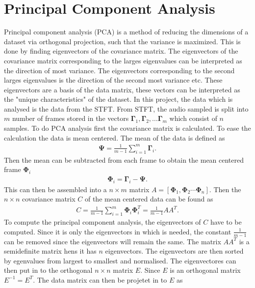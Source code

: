 \section{Principal Component Analysis}
Principal component analysis (PCA) is a method of reducing the dimensions of a dataset via orthogonal projection, such that the variance is maximized. This is done by finding eigenvectors of the covariance matrix.
The eigenvectors of the covariance matrix corresponding to the larges eigenvalues can be interpreted as the direction of most variance. The eigenvectors corresponding to the second larges eigenvalues is the direction of the second most variance etc. These eigenvectors are a basis of the data matrix, these vectors can be interpreted as the "unique characteristics" of the dataset. In this project, the data which is analysed is the data from the STFT. \cite[561]{patternmachineleaning}
From STFT, the audio sampled is split into $m$ number of frames stored in the vectors $\mathbf{\Gamma}_1, \mathbf{\Gamma}_2,\hdots\mathbf{\Gamma}_m$ which consist of $n$ samples.
To do PCA analysis first the covariance matrix is calculated. To ease the calculation the data is mean centered. The mean of the data is defined as
\begin{align*}
    \mathbf{\Psi}=\frac{1}{m-1}\sum_{i=1}^m \mathbf{\Gamma}_i.
\end{align*}
Then the mean can be subtracted from each frame to obtain the mean centered frame $\mathbf{\Phi}_i$
\begin{align*}
    \mathbf{\Phi}_i=\mathbf{\Gamma}_i-\mathbf{\Psi}.
\end{align*}
This can then be assembled into a $n\times m$ matrix $A=[\mathbf{\Phi}_1,\mathbf{\Phi}_2\cdots\mathbf{\Phi}_n]$. Then the $n\times n$ covariance matrix $C$ of the mean centered data can be found as
\begin{align*}
    C=\frac{1}{m-1}\sum_{i=1}^m\mathbf{\Phi}_i\mathbf{\Phi}_i^T=\frac{1}{m-1}AA^T. 
\end{align*}
To compute the principal component analysis, the eigenvectors of $C$ have to be computed. Since it is only the eigenvectors in which is needed, the constant $\frac{1}{m-1}$ can be removed since the eigenvectors will remain the same. The matrix $AA^T$ is a semidefinite matrix hens it has $n$ eigenvectors. The eigenvectors are then sorted by egenvalues from largest to smallest and normalised. The eigenvectores can then put in to the orthogonal $n\times n$ matrix $E$.
Since $E$ is an orthogonal matrix $E^{-1}=E^T$. The data matrix can then be projetet in to $E$ as
